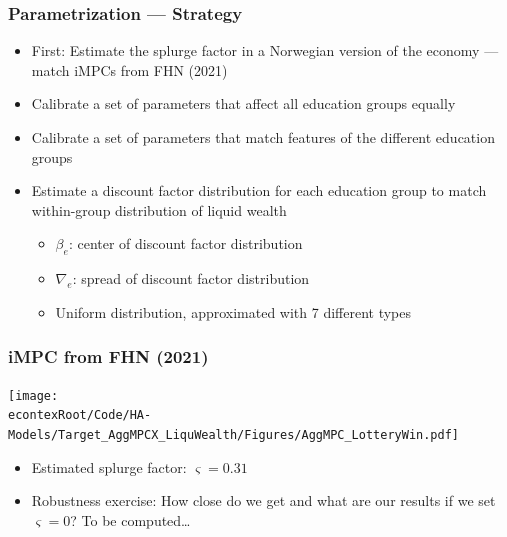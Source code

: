 \documentclass[pdflatex,aspectratio=169]{beamer}
\begin{document}
\begin{frame}
\frametitle{Parametrization --- Strategy}
\begin{itemize} 
\itemsep = \bigskipamount 
\item First: Estimate the splurge factor in a Norwegian version of the economy --- match iMPCs from FHN (2021)
\item Calibrate a set of parameters that affect all education groups equally 
\item Calibrate a set of parameters that match features of the different education groups 
\item Estimate a discount factor distribution for each education group to match within-group distribution of liquid wealth
	\begin{itemize}
	\itemsep = .25\bigskipamount 
	\item $\beta_e$: center of discount factor distribution
	\item $\nabla_e$: spread of discount factor distribution 
	\item Uniform distribution, approximated with 7 different types
	\end{itemize}
\end{itemize} 
\end{frame}

\begin{frame}
	\frametitle{iMPC from FHN (2021)}
	\centering 
	\texttt{[image: \\econtexRoot/Code/HA-Models/Target\_AggMPCX\_LiquWealth/Figures/AggMPC\_LotteryWin.pdf]}
	\begin{itemize}
		\itemsep = .5\bigskipamount 
		\item Estimated splurge factor: $\varsigma = 0.31$
		\item Robustness exercise: How close do we get and what are our results if we set $\varsigma = 0$? To be computed\ldots 
	\end{itemize}
\end{frame}
\end{document}
